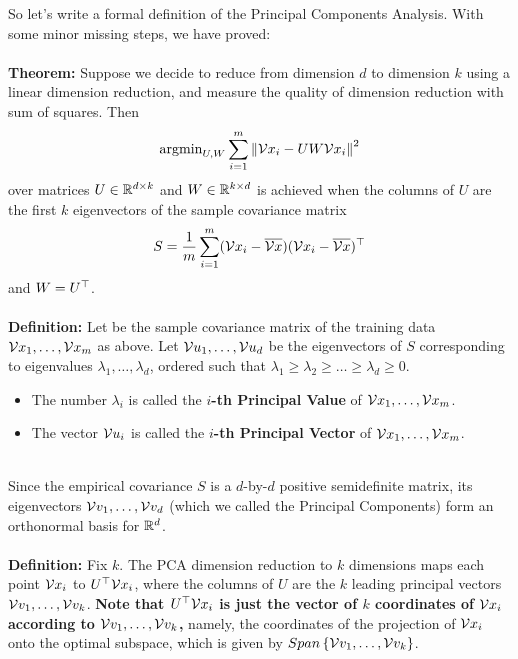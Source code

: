 So let's write a formal definition of the Principal Components Analysis.
With some minor missing steps, we have proved:
\\~\\
 {\bf Theorem:} Suppose we decide to reduce from dimension $d$ to
 dimension $k$ using a linear dimension reduction, and measure the quality of
 dimension reduction with sum of squares. Then
            \[
              \text{argmin}_{U,W} \sum_{i=1}^m\left\| \mathcal{V}{x}_i - UW\mathcal{V}{x}_i\right\|^2
         \]
         over matrices $U\in\mathbb{R}^{d\times k}$ and $W\in\mathbb{R}^{k\times d}$
         is achieved when the columns of $U$ are the first $k$ eigenvectors of
         the sample covariance matrix 
         \[
           S = \frac{1}{m}\sum_{i=1}^m (\mathcal{V}{x}_i-\overline{\mathcal{V}{x}}) 
           (\mathcal{V}{x}_i -\overline{\mathcal{V}{x}})^{\top}
         \]
         and $W=U^{\top}$.
\\~\\
 {\bf Definition:} Let
         be the sample covariance matrix of the training data
         $\mathcal{V}{x}_1,\ldots,\mathcal{V}{x}_m$ as above.
         Let $\mathcal{V}{u}_1,\ldots,\mathcal{V}{u}_d$ be the eigenvectors of $S$ corresponding
         to eigenvalues $\lambda_1,\ldots,\lambda_d$, ordered such that
         $\lambda_1\geq \lambda_2\geq \ldots \geq \lambda_d\geq 0$.


        \begin{itemize}
          \item The number $\lambda_i$ is called the {\bf $i$-th Principal
            Value} of  $\mathcal{V}{x}_1,\ldots,\mathcal{V}{x}_m$.
          \item The vector $\mathcal{V}{u}_i$ is called the {\bf $i$-th Principal
            Vector} of  $\mathcal{V}{x}_1,\ldots,\mathcal{V}{x}_m$.
        \end{itemize}
~\\
Since the empirical covariance $S$ is  a $d$-by-$d$ positive semidefinite
matrix, its eigenvectors $\mathcal{V}{v}_1,\ldots, \mathcal{V}{v}_d$ (which we called the Principal Components) form an
orthonormal basis for $\mathbb{R}^d$. 
\\~\\
{\bf Definition:} Fix $k$. 
The PCA dimension reduction to $k$ dimensions maps each point
$\mathcal{V}{x}_i$ to
$U^\top \mathcal{V}{x}_i$, where the columns of $U$ are the $k$ leading principal
vectors $\mathcal{V}{v}_1,\ldots,\mathcal{V}{v}_k$.
{\bf Note that $U^\top \mathcal{V}{x}_i$ is just the vector of $k$ coordinates of
$\mathcal{V}{x}_i$ according to $\mathcal{V}{v}_1,\ldots,\mathcal{V}{v}_k$,} namely, the
  coordinates of the projection of $\mathcal{V}{x}_i$ onto the optimal subspace, 
  which is given by $Span\left\{ \mathcal{V}{v}_1,\ldots,\mathcal{V}{v}_k \right\}$.

